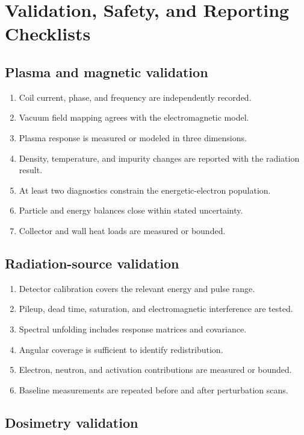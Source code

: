 \chapter{Validation, Safety, and Reporting Checklists}
\label{app:validation}

\section{Plasma and magnetic validation}

\begin{enumerate}[label=$\square$]
\item Coil current, phase, and frequency are independently recorded.
\item Vacuum field mapping agrees with the electromagnetic model.
\item Plasma response is measured or modeled in three dimensions.
\item Density, temperature, and impurity changes are reported with the radiation result.
\item At least two diagnostics constrain the energetic-electron population.
\item Particle and energy balances close within stated uncertainty.
\item Collector and wall heat loads are measured or bounded.
\end{enumerate}

\section{Radiation-source validation}

\begin{enumerate}[label=$\square$]
\item Detector calibration covers the relevant energy and pulse range.
\item Pileup, dead time, saturation, and electromagnetic interference are tested.
\item Spectral unfolding includes response matrices and covariance.
\item Angular coverage is sufficient to identify redistribution.
\item Electron, neutron, and activation contributions are measured or bounded.
\item Baseline measurements are repeated before and after perturbation scans.
\end{enumerate}

\section{Dosimetry validation}

